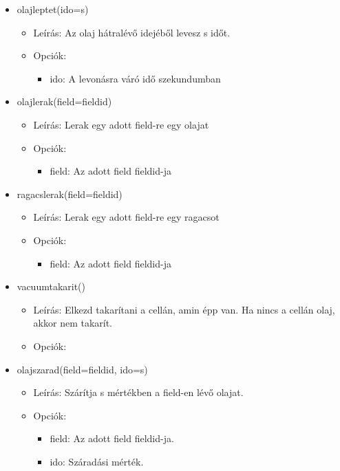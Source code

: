 \begin{itemize}
    \item olajleptet(ido=s)
    \begin{itemize}
    	\item Leírás: Az olaj hátralévő idejéből levesz s időt.
    	\item Opciók: 
    	\begin{itemize}
    		\item ido: A levonásra váró idő szekundumban
    	\end{itemize}	
    \end{itemize}
    
    \item olajlerak(field=fieldid)
    \begin{itemize}
       	\item Leírás: Lerak egy adott field-re egy olajat
       	\item Opciók: 
       	\begin{itemize}
       		\item field: Az adott field fieldid-ja
       	\end{itemize}	
    \end{itemize}
    
    \item ragacslerak(field=fieldid)
    \begin{itemize}
    	\item Leírás: Lerak egy adott field-re egy ragacsot
    	\item Opciók: 
    	\begin{itemize}
    		\item field: Az adott field fieldid-ja
    	\end{itemize}	
    \end{itemize}    
    
    \item vacuumtakarit()
    \begin{itemize}
    	\item Leírás: Elkezd takarítani a cellán, amin épp van. Ha nincs a cellán olaj, akkor nem takarít.
    	\item Opciók: 
    \end{itemize}    
    
    \item olajszarad(field=fieldid, ido=s)
    \begin{itemize}
    	\item Leírás: Szárítja s mértékben a field-en lévő olajat.
    	\item Opciók: 
    	\begin{itemize}
    		\item field: Az adott field fieldid-ja.
	    	\item ido: Száradási mérték.
    	\end{itemize}	
    \end{itemize}    

    

\end{itemize}

